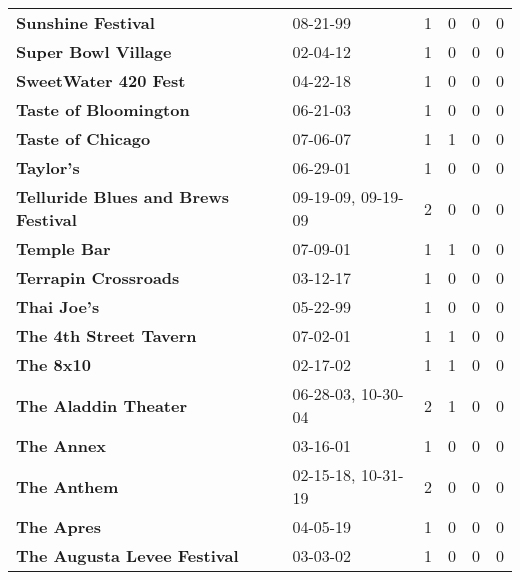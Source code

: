 \begin{supertabular}{p{0.4\textwidth}p{0.3\textwidth}p{0.05\textwidth}p{0.05\textwidth}p{0.05\textwidth}p{0.05\textwidth}}
                                           \textbf{Sunshine Festival} &            08-21-99 &  1 &  0 &  0 &  0 \\
                                          \textbf{Super Bowl Village} &            02-04-12 &  1 &  0 &  0 &  0 \\
                                         \textbf{SweetWater 420 Fest} &            04-22-18 &  1 &  0 &  0 &  0 \\
                                        \textbf{Taste of Bloomington} &            06-21-03 &  1 &  0 &  0 &  0 \\
                                            \textbf{Taste of Chicago} &            07-06-07 &  1 &  1 &  0 &  0 \\
                                                    \textbf{Taylor's} &            06-29-01 &  1 &  0 &  0 &  0 \\
                          \textbf{Telluride Blues and Brews Festival} &  09-19-09, 09-19-09 &  2 &  0 &  0 &  0 \\
                                                  \textbf{Temple Bar} &            07-09-01 &  1 &  1 &  0 &  0 \\
                                         \textbf{Terrapin Crossroads} &            03-12-17 &  1 &  0 &  0 &  0 \\
                                                  \textbf{Thai Joe's} &            05-22-99 &  1 &  0 &  0 &  0 \\
                                       \textbf{The 4th Street Tavern} &            07-02-01 &  1 &  1 &  0 &  0 \\
                                                    \textbf{The 8x10} &            02-17-02 &  1 &  1 &  0 &  0 \\
                                         \textbf{The Aladdin Theater} &  06-28-03, 10-30-04 &  2 &  1 &  0 &  0 \\
                                                   \textbf{The Annex} &            03-16-01 &  1 &  0 &  0 &  0 \\
                                                  \textbf{The Anthem} &  02-15-18, 10-31-19 &  2 &  0 &  0 &  0 \\
                                                   \textbf{The Apres} &            04-05-19 &  1 &  0 &  0 &  0 \\
                                  \textbf{The Augusta Levee Festival} &            03-03-02 &  1 &  0 &  0 &  0 \\

\end{supertabular}
